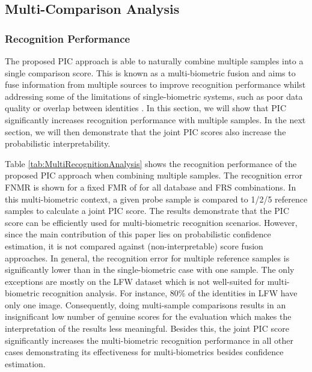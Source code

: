 \documentclass[10pt,twocolumn,letterpaper]{article}
\begin{document}
\subsection{Multi-Comparison Analysis}
\label{sec:MultiComparisonAnalysis}
\vspace{-2mm}
\subsubsection{Recognition Performance}
\label{sec:MultiRecognition}
\vspace{-2mm}
The proposed PIC approach is able to naturally combine multiple samples into a single comparison score.
This is known as a multi-biometric fusion and aims to fuse information from multiple sources to improve recognition performance whilst addressing some of the limitations of single-biometric systems, such as poor data quality \cite{DBLP:conf/cvpr/TerhorstKDKK20} or overlap between identities \cite{DBLP:journals/inffus/SinghSR19}.
In this section, we will show that PIC significantly increases recognition performance with multiple samples.
In the next section, we will then demonstrate that the joint PIC scores also increase the probabilistic interpretability.

Table \ref{tab:MultiRecognitionAnalysis} shows the recognition performance of the proposed PIC approach when combining multiple samples.
The recognition error FNMR is shown for a fixed FMR of  for all database and FRS combinations.
In this multi-biometric context, a given probe sample is compared to 1/2/5 reference samples to calculate a joint PIC score.
The results demonstrate that the PIC score can be efficiently used for multi-biometric recognition scenarios.
{However, since the main contribution of this paper lies on probabilistic confidence estimation, it is not compared against (non-interpretable) score fusion approaches.}
In general, the recognition error for multiple reference samples is significantly lower than in the single-biometric case with one sample.
The only exceptions are mostly on the LFW dataset which is not well-suited for multi-biometric recognition analysis. 
For instance, 80\% of the identities in LFW have only one image.
Consequently, doing multi-sample comparisons results in an insignificant low number of genuine scores for the evaluation which makes the interpretation of the results less meaningful.
Besides this, the joint PIC score significantly increases the multi-biometric recognition performance in all other cases demonstrating its effectiveness for multi-biometrics besides confidence estimation.
\end{document}
